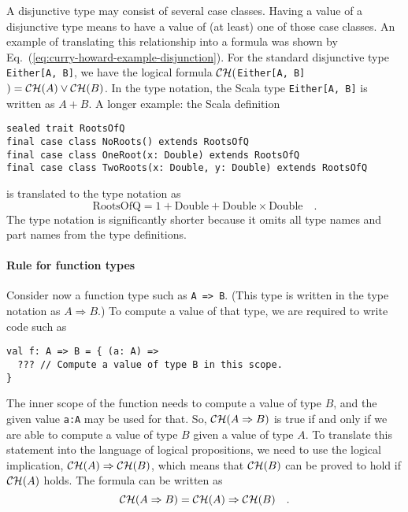 A disjunctive type may consist of several case classes. Having a value
of a disjunctive type means to have a value of (at least) one of those
case classes. An example of translating this relationship into a formula
was shown by Eq.~(\ref{eq:curry-howard-example-disjunction}). For
the standard disjunctive type \lstinline!Either[A, B]!,
we have the logical formula ${\cal CH}($\lstinline!Either[A, B]!$)={\cal CH}(A)\vee{\cal CH}(B)$.
In the type notation, the Scala type \lstinline!Either[A, B]!
is written as $A+B$. A longer example: the Scala definition
\begin{lstlisting}
sealed trait RootsOfQ
final case class NoRoots() extends RootsOfQ
final case class OneRoot(x: Double) extends RootsOfQ
final case class TwoRoots(x: Double, y: Double) extends RootsOfQ
\end{lstlisting}
is translated to the type notation as
\[
\text{RootsOfQ}=1+\text{Double}+\text{Double}\times\text{Double}\quad.
\]
The type notation is significantly shorter because it omits all type
names and part names from the type definitions.

\paragraph{Rule for function types}

Consider now a function type such as \lstinline!A => B!.
(This type is written in the type notation as $A\Rightarrow B$.)
To compute a value of that type, we are required to write code such
as
\begin{lstlisting}
val f: A => B = { (a: A) =>
  ??? // Compute a value of type B in this scope.
}
\end{lstlisting}
The inner scope of the function needs to compute a value of type $B$,
and the given value \lstinline!a:A!
may be used for that. So, ${\cal CH}(A\Rightarrow B)$ is true if
and only if we are able to compute a value of type $B$ given a value
of type $A$. To translate this statement into the language of logical
propositions, we need to use the logical implication, ${\cal CH}(A)\Rightarrow{\cal CH}(B)$,
which means that ${\cal CH}(B)$ can be proved to hold if ${\cal CH}(A)$
holds. The formula can be written as
\[
{\cal CH}(A\Rightarrow B)={\cal CH}(A)\Rightarrow{\cal CH}(B)\quad.
\]


